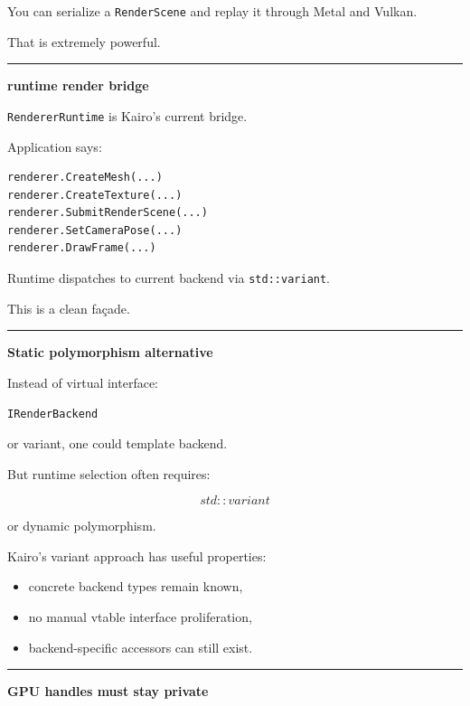 You can serialize a \texttt{RenderScene} and replay it through Metal and Vulkan.

That is extremely powerful.

\begin{center}\rule{0.5\linewidth}{0.5pt}\end{center}

\textbf{runtime render bridge}

\texttt{RendererRuntime} is Kairo's current bridge.

Application says:

\begin{verbatim}
renderer.CreateMesh(...)
renderer.CreateTexture(...)
renderer.SubmitRenderScene(...)
renderer.SetCameraPose(...)
renderer.DrawFrame(...)
\end{verbatim}

Runtime dispatches to current backend via \texttt{std::variant}.

This is a clean façade.

\begin{center}\rule{0.5\linewidth}{0.5pt}\end{center}

\textbf{Static polymorphism alternative}

Instead of virtual interface:

\begin{verbatim}
IRenderBackend
\end{verbatim}

or variant, one could template backend.

But runtime selection often requires:

\[
std::variant
\]

or dynamic polymorphism.

Kairo's variant approach has useful properties:

\begin{itemize}
\tightlist
\item
  concrete backend types remain known,
\item
  no manual vtable interface proliferation,
\item
  backend-specific accessors can still exist.
\end{itemize}

\begin{center}\rule{0.5\linewidth}{0.5pt}\end{center}

\textbf{GPU handles must stay private}

